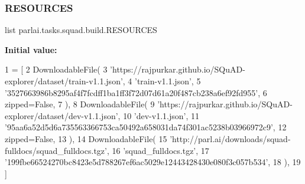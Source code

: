 \subsubsection{\texorpdfstring{R\+E\+S\+O\+U\+R\+C\+ES}{RESOURCES}}
{\footnotesize\ttfamily list parlai.\+tasks.\+squad.\+build.\+R\+E\+S\+O\+U\+R\+C\+ES}

{\bfseries Initial value\+:}
\begin{DoxyCode}
1 =  [
2     DownloadableFile(
3         \textcolor{stringliteral}{'https://rajpurkar.github.io/SQuAD-explorer/dataset/train-v1.1.json'},
4         \textcolor{stringliteral}{'train-v1.1.json'},
5         \textcolor{stringliteral}{'3527663986b8295af4f7fcdff1ba1ff3f72d07d61a20f487cb238a6ef92fd955'},
6         zipped=\textcolor{keyword}{False},
7     ),
8     DownloadableFile(
9         \textcolor{stringliteral}{'https://rajpurkar.github.io/SQuAD-explorer/dataset/dev-v1.1.json'},
10         \textcolor{stringliteral}{'dev-v1.1.json'},
11         \textcolor{stringliteral}{'95aa6a52d5d6a735563366753ca50492a658031da74f301ac5238b03966972c9'},
12         zipped=\textcolor{keyword}{False},
13     ),
14     DownloadableFile(
15         \textcolor{stringliteral}{'http://parl.ai/downloads/squad-fulldocs/squad\_fulldocs.tgz'},
16         \textcolor{stringliteral}{'squad\_fulldocs.tgz'},
17         \textcolor{stringliteral}{'199fbe66524270bc8423e5d788267ef6ac5029e12443428430e080f3c057b534'},
18     ),
19 ]
\end{DoxyCode}
